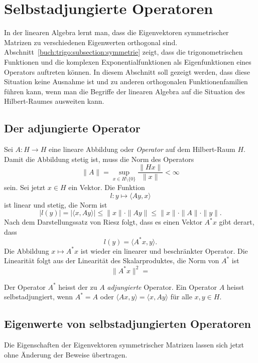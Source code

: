 %
%
%
\section{Selbstadjungierte Operatoren
\label{buch:orthofkt:section:sa}}
In der linearen Algebra lernt man, dass die Eigenvektoren
symmetrischer Matrizen zu verschiedenen Eigenwerten orthogonal
sind.
Abschnitt~\ref{buch:trigo:subsection:symmetrie}
zeigt, dass die trigonometrischen Funktionen und die
komplexen Exponentialfunktionen als Eigenfunktionen eines
Operators auftreten können.
In diesem Abschnitt soll gezeigt werden, dass diese Situation
keine Ausnahme ist und zu anderen orthogonalen Funktionenfamilien
führen kann, wenn man die Begriffe der linearen Algebra auf
die Situation des Hilbert-Raumes ausweiten kann.


%
%
\subsection{Der adjungierte Operator}
Sei $A:H\to H$ eine lineare Abbildung oder {\em Operator} auf dem
Hilbert-Raum $H$.
Damit die Abbildung stetig ist, muss die Norm des Operators
\[
\|A\|
=
\sup_{x\in H\setminus\{0\}} \frac{\|Hx\|}{\|x\|}
<
\infty
\]
sein.
Sei jetzt $x\in H$ ein Vektor.
Die Funktion
\[
l
\colon
y\mapsto \langle Ay,x\rangle
\]
ist linear und stetig, die Norm ist
\[
|l(y)|
=
|\langle x, Ay\rangle|
\le
\|x\|
\cdot
\|Ay\|
\le
\|x\| \cdot \|A\| \cdot \|y\|
.
\]
Nach dem Darstellungssatz von Riesz folgt, dass es einen Vektor 
$A^*x$ gibt derart, dass
\[
l(y) = \langle A^*x,y\rangle.
\]
Die Abbildung $x\mapsto A^*x$ ist wieder ein linearer und beschränkter
Operator.
Die Linearität folgt aus der Linearität des Skalarproduktes, die Norm
von $A^*$ ist
\[
\|A^*x\|^2
=
\]

\begin{definition}
Der Operator $A^*$ heisst der zu $A$ {\em adjungierte} Operator.
Ein Operator $A$ heisst selbstadjungiert, wenn $A^*=A$ oder
$\langle Ax,y\rangle = \langle x,Ay\rangle$ für alle $x,y\in H$.
\end{definition}


%
%
\subsection{Eigenwerte von selbstadjungierten Operatoren}
Die Eigenschaften der Eigenvektoren symmetrischer Matrizen lassen
sich jetzt ohne Änderung der Beweise übertragen.

